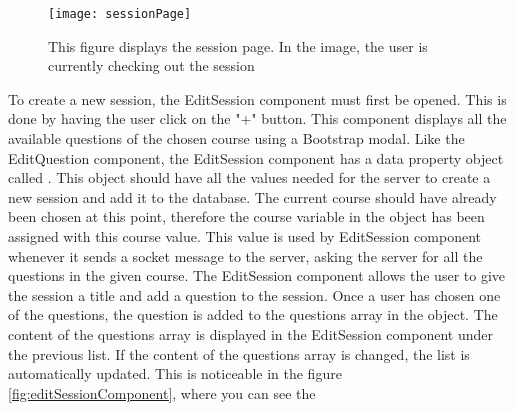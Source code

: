 \begin{figure}[H]
    \texttt{[image: sessionPage]}
    \caption{This figure displays the session page. In the image, the user is currently checking out the session %
    }
    \label{fig:sessionPage}
\end{figure}
\noindent
To create a new session, the EditSession component must first be opened. This is done by having the user click on the "+" button.
This component displays all the available questions of the chosen course using a Bootstrap modal. Like the EditQuestion component, the EditSession component has a data property object called . This object should have all the values needed for the server to create a new session and add it to the database. The current course should have already been chosen at this point, therefore the course variable in the  object has been assigned with this course value. This value is used by EditSession component whenever it sends a socket message to the server, asking the server for all the questions in the given course. The EditSession component allows the user to give the session a title and add a question to the session. Once a user has chosen one of the questions, the question is added to the questions array in the  object. The content of the questions array is displayed in the EditSession component under the previous list. If the content of the questions array is changed, the list is automatically updated. This is noticeable in the figure \ref{fig:editSessionComponent}, where you can see the %
